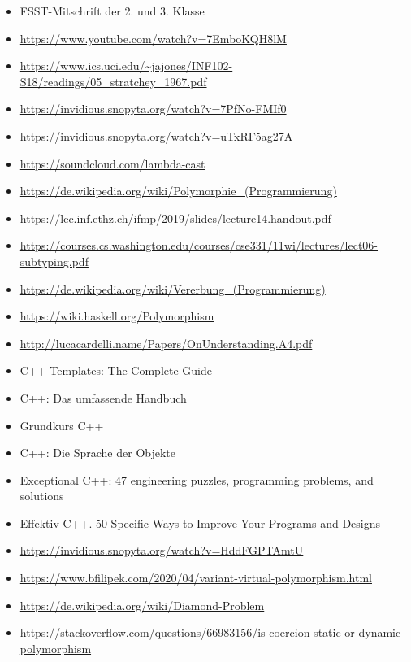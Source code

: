 \begin{itemize}
	\item FSST-Mitschrift der 2. und 3. Klasse
	\item \url{https://www.youtube.com/watch?v=7EmboKQH8lM}
	\item \url{https://www.ics.uci.edu/~jajones/INF102-S18/readings/05_stratchey_1967.pdf}
	\item \url{https://invidious.snopyta.org/watch?v=7PfNo-FMIf0}
	\item \url{https://invidious.snopyta.org/watch?v=uTxRF5ag27A}
	\item \url{https://soundcloud.com/lambda-cast}
	\item \url{https://de.wikipedia.org/wiki/Polymorphie_(Programmierung)}
	\item \url{https://lec.inf.ethz.ch/ifmp/2019/slides/lecture14.handout.pdf}
	\item \url{https://courses.cs.washington.edu/courses/cse331/11wi/lectures/lect06-subtyping.pdf}
	\item \url{https://de.wikipedia.org/wiki/Vererbung_(Programmierung)}
	\item \url{https://wiki.haskell.org/Polymorphism}
	\item \url{http://lucacardelli.name/Papers/OnUnderstanding.A4.pdf}
	\item C++ Templates: The Complete Guide
	\item C++: Das umfassende Handbuch
	\item Grundkurs C++
	\item C++: Die Sprache der Objekte
	\item Exceptional C++: 47 engineering puzzles, programming problems, and solutions
	\item Effektiv C++. 50 Specific Ways to Improve Your Programs and Designs
	\item \url{https://invidious.snopyta.org/watch?v=HddFGPTAmtU}
	\item \url{https://www.bfilipek.com/2020/04/variant-virtual-polymorphism.html}
	\item \url{https://de.wikipedia.org/wiki/Diamond-Problem}
	\item \url{https://stackoverflow.com/questions/66983156/is-coercion-static-or-dynamic-polymorphism}
\end{itemize}
